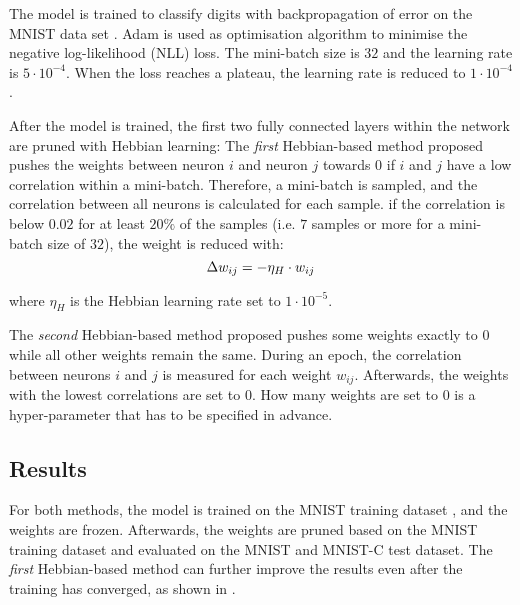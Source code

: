 The model is trained to classify digits with backpropagation of error on the MNIST data set \cite{Lecun_Bottou_Bengio_Haffner_1998}.
Adam  is used as optimisation algorithm to minimise the negative log-likelihood (NLL) loss.
The mini-batch size is \(32\) and the learning rate is \(5\cdot 10^{-4}\).
When the loss reaches a plateau, the learning rate is reduced to \(1\cdot 10^{-4}\).

After the model is trained, the first two fully connected layers within the network are pruned with Hebbian learning:
The \emph{first} Hebbian-based method proposed pushes the weights between neuron \(i\) and neuron \(j\) towards \(0\) if \(i\) and \(j\) have a low correlation within a mini-batch.
Therefore, a mini-batch is sampled, and the correlation between all neurons is calculated for each sample.
if the correlation is below \(0.02\) for at least \(20\%\) of the samples (i.e. \(7\) samples or more for a mini-batch size of \(32\)), the weight is reduced with:
\begin{equation}\eqlbl{hebb_towards_0}
	\Delta w_{ij} = - \eta_H \cdot w_{ij}
\end{equation}

where \(\eta_H\) is the Hebbian learning rate set to \(1\cdot 10^{-5}\).

The \emph{second} Hebbian-based method proposed pushes some weights exactly to \(0\) while all other weights remain the same.
During an epoch, the correlation between neurons \(i\) and \(j\) is measured for each weight \(w_{ij}\).
Afterwards, the weights with the lowest correlations are set to \(0\).
How many weights are set to \(0\) is a hyper-parameter that has to be specified in advance.


\subsection{Results}
For both methods, the model is trained on the MNIST training dataset \cite{MNIST}, and the weights are frozen.
Afterwards, the weights are pruned based on the MNIST training dataset and evaluated on the MNIST and MNIST-C \cite{Mu_Gilmer_2019} test dataset.
The \emph{first} Hebbian-based method can further improve the results even after the training has converged, as shown in .


